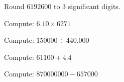 \documentclass[handout,noauthor,nooutcomes]{ximera}
\author{Bart Snapp}
\begin{document}
\maketitle


\begin{exercise}
Round $6192600$ to $3$ significant digits. 
\end{exercise}


\begin{exercise}
 Compute: $6.10\times 6271$
\end{exercise}


\begin{exercise}
Compute: $150000\div 440.000$
\end{exercise}
  

\begin{exercise}
 Compute: $61100+4.4$
\end{exercise}

\begin{exercise}
  Compute: $870000000 - 657000$
  \end{exercise}


\end{document}

